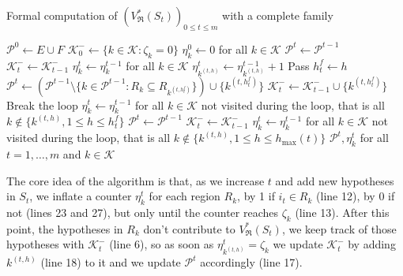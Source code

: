 \documentclass[
  11pt,
  a4paper,
]{article}
\theoremstyle{definition}
\theoremstyle{plain}
\theoremstyle{plain}
\theoremstyle{plain}
\theoremstyle{definition}
\theoremstyle{remark}
\begin{document}
\begin{algorithm}[htb!]
\caption{Formal computation of $(V^*_{\mathfrak{R}}(S_t))_{0\leq t\leq m}$ with a complete family}
\label{alg-formal-curve}
\begin{algorithmic}[1]
  \State $\mathcal{P}^0\gets E\cup F$  
  \State $\mathcal{K}^-_0\gets\{k\in\mathcal{K} : \zeta_k=0  \}$
  \State $\eta^0_k\gets0$ for all $k\in\mathcal{K}$
      \State $\mathcal{P}^t \gets \mathcal{P}^{t-1}$
      \State $\mathcal{K}^-_t \gets \mathcal{K}^-_{t-1}$
      \State $\eta^t_k\gets\eta^{t-1}_k$ for all $k\in\mathcal{K}$
    \Else
        \State $\eta^t_{k^{(t,h)}}\gets\eta^{t-1}_{k^{(t,h)}} + 1$
          \State Pass
        \Else
          \State $h^f_t \gets h$ 
          \State $\mathcal{P}^t \gets\left( \mathcal{P}^{t-1}\setminus \{ k\in \mathcal{P}^{t-1} : R_k\subseteq R_{k^{(t,h^f_t)}} \}\right)\cup \{ k^{(t,h^f_t)} \}$
          \State $\mathcal{K}^-_t \gets \mathcal{K}^-_{t-1} \cup \{k^{(t,h^f_t)}\}$
          \State Break the loop
        \EndIf
      \EndFor
        \State $\eta^t_k\gets\eta^{t-1}_k$ for all $k\in\mathcal{K}$ not visited during the loop, that is all $k\not\in\{k^{(t,h)}, 1\leq h\leq h^f_t   \}$
      \Else
        \State $\mathcal{P}^t \gets \mathcal{P}^{t-1}$
        \State $\mathcal{K}^-_t \gets \mathcal{K}^-_{t-1}$
        \State $\eta^t_k\gets\eta^{t-1}_k$ for all $k\in\mathcal{K}$ not visited during the loop, that is all $k\not\in\{k^{(t,h)}, 1\leq h\leq h_{\max}(t)   \}$
      \EndIf
    \EndIf
  \EndFor
  \State\Return $\mathcal{P}^t, \eta^t_k$ for all $t=1,\dotsc, m$ and $k\in\mathcal{K}$
\EndProcedure
\end{algorithmic}
\end{algorithm}

The core idea of the algorithm is that, as we increase \(t\) and add new
hypotheses in \(S_t\), we inflate a counter \(\eta_k^t\) for each region
\(R_k\), by 1 if \(i_t\in R_k\) (line 12), by 0 if not (lines 23 and
27), but only until the counter reaches \(\zeta_k\) (line 13). After
this point, the hypotheses in \(R_k\) don't contribute to
\(V^*_{\mathfrak{R}}(S_t)\), we keep track of those hypotheses with
\(\mathcal{K}^-_t\) (line 6), so as soon as
\(\eta^t_{k^{(t,h)}}=\zeta_k\) we update \(\mathcal{K}^-_t\) by adding
\(k^{(t,h)}\) (line 18) to it and we update \(\mathcal{P}^t\)
accordingly (line 17).
\end{document}
